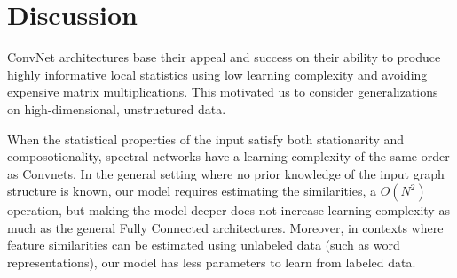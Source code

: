 \documentclass{article} %
\begin{document}
\section{Discussion}

ConvNet architectures base their appeal and success on their 
ability to produce highly informative local statistics using low learning complexity
and avoiding expensive matrix multiplications. This motivated us to 
consider generalizations on high-dimensional, unstructured data.

When the statistical properties of the input satisfy both stationarity 
and composotionality, spectral networks have a learning complexity 
of the same order as Convnets. In the general setting where no
prior knowledge of the input graph structure is known, our model 
requires estimating the similarities, a $O(N^2)$ operation, but making
the model deeper does not increase learning complexity as much as 
the general Fully Connected architectures. Moreover, in contexts
where feature similarities can be estimated using unlabeled data (such as
word representations), our model has less parameters to learn from labeled data.
\end{document}
